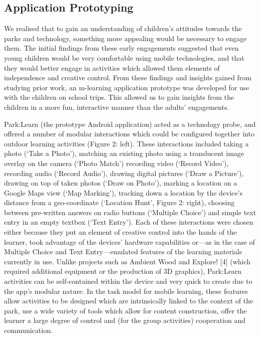 \subsection{Application Prototyping}

We realised that to gain an understanding of children’s attitudes towards the parks and technology, something more appealing would be necessary to engage them. The initial findings from these early engagements suggested that even young children would be very comfortable using mobile technologies, and that they would better engage in activities which allowed them elements of independence and creative control. From these findings and insights gained from studying prior work, an m-learning application prototype was developed for use with the children on school trips. This allowed us to gain insights from the children in a more fun, interactive manner than the adults’ engagements.

Park:Learn (the prototype Android application) acted as a technology probe, and offered a number of modular interactions which could be configured together into outdoor learning activities (Figure 2: left). These interactions included taking a photo (‘Take a Photo’), matching an existing photo using a translucent image overlay on the camera (‘Photo Match’) recording video (‘Record Video’), recording audio (‘Record Audio’), drawing digital pictures (‘Draw a Picture’), drawing on top of taken photos (‘Draw on Photo’), marking a location on a Google Maps view (‘Map Marking’), tracking down a location by the device’s distance from a geo-coordinate (‘Location Hunt’, Figure 2: right), choosing between pre-written answers on radio buttons (‘Multiple Choice’) and simple text entry in an empty textbox (‘Text Entry’). Each of these interactions were chosen either because they put an element of creative control into the hands of the learner, took advantage of the devices’ hardware capabilities or—as in the case of Multiple Choice and Text Entry—emulated features of the learning materials currently in use. Unlike projects such as Ambient Wood and Explore! [4] (which required additional equipment or the production of 3D graphics), Park:Learn activities can be self-contained within the device and very quick to create due to the app’s modular nature. In the task model for mobile learning, these features allow activities to be designed which are intrinsically linked to the context of the park, use a wide variety of tools which allow for content construction, offer the learner a large degree of control and (for the group activities) cooperation and communication. 

